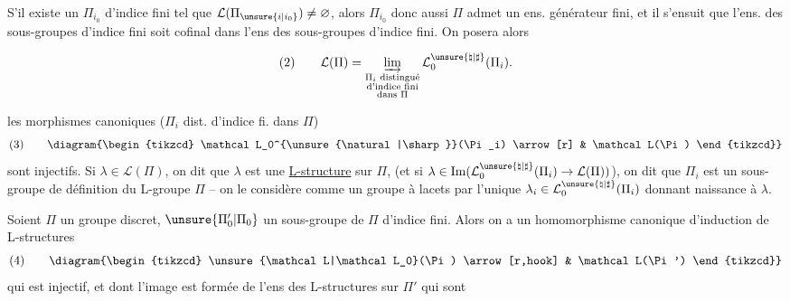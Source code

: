 S'il existe un $\Pi_{i_0}$ d'indice fini tel que
$\mathcal L(\Pi_{\unsure{i|i_0}})\ne\varnothing$, alors $\Pi_{i_0}$ donc aussi $\Pi$ admet
un ens. générateur fini, et il s'ensuit
que l'ens. des sous-groupes  d'indice fini
soit cofinal dans l'ens des sous-groupes
d'indice fini. On posera alors


\[
\text{(2)}\qquad
\mathcal L(\Pi)=
\varinjlim_{\substack{\Pi_i\text{ distingué}\\
\text{d'indice fini}\\
\text{dans }\Pi}}
\mathcal L_0^{\unsure{\natural|\sharp}}(\Pi_i).
\]


les morphismes canoniques ($\Pi_i$ dist. d'indice fi.
dans $\Pi$)
\[
\text{(3)}\qquad
\diagram{\begin{tikzcd}
\mathcal L_0^{\unsure{\natural|\sharp}}(\Pi_i) \arrow[r] & \mathcal L(\Pi)
\end{tikzcd}}
\]
sont injectifs. Si $\lambda\in\mathcal L(\Pi)$, on dit que
$\lambda$ est une \uline{L-structure} sur $\Pi$,
(et si
$\lambda\in\operatorname{Im}(\mathcal L_0^{\unsure{\natural|\sharp}}(\Pi_i)\to\mathcal L(\Pi))$),
on dit que $\Pi_i$ est
un sous-groupe de définition du L-groupe
$\Pi$ -- on le considère comme un
groupe à lacets par l'unique $\lambda_i\in\mathcal L_0^{\unsure{\natural|\sharp}}(\Pi_i)$
donnant naissance à $\lambda$.

Soient $\Pi$ un groupe discret, $\unsure{\Pi'_0|\Pi_0}$ un
sous-groupe de $\Pi$ d'indice fini. Alors
on a un homomorphisme canonique
d'induction de L-structures
\[
\text{(4)}\qquad
\diagram{\begin{tikzcd}
\unsure{\mathcal L|\mathcal L_0}(\Pi) \arrow[r,hook] & \mathcal L(\Pi')
\end{tikzcd}}
\]
qui est injectif, et dont l'image est formée
de l'ens des L-structures sur $\Pi'$ qui sont

